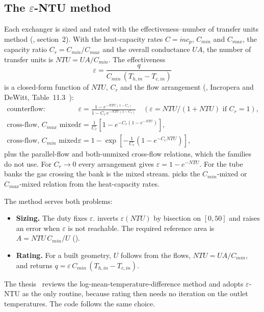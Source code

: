 \documentclass[a4paper,11pt]{article}
\begin{document}
\subsection{The $\varepsilon$-NTU method}\label{sec:entu}
Each exchanger is sized and rated with the effectiveness--number of transfer units method
(, section~2). With the heat-capacity rates $C = \dot m c_p$,
$C_{min}$ and $C_{max}$, the capacity ratio $C_r = C_{min}/C_{max}$ and the overall
conductance $UA$, the number of transfer units is $NTU = UA/C_{min}$. The effectiveness
\begin{equation}
  \varepsilon = \frac{q}{C_{min}\,(T_{h,in} - T_{c,in})}
\end{equation}
is a closed-form function of $NTU$, $C_r$ and the flow arrangement
(, Incropera and DeWitt, Table~11.3~\cite{incropera}):
\begin{align}
  \text{counterflow:}&\quad \varepsilon = \frac{1 - e^{-NTU(1-C_r)}}{1 - C_r\,e^{-NTU(1-C_r)}}
    \quad(\varepsilon = NTU/(1+NTU) \text{ if } C_r = 1),\\
  \text{cross-flow, } C_{max}\text{ mixed:}&\quad \varepsilon = \frac{1}{C_r}\left[1 - e^{-C_r(1 - e^{-NTU})}\right],\\
  \text{cross-flow, } C_{min}\text{ mixed:}&\quad \varepsilon = 1 - \exp\!\left[-\frac{1}{C_r}\left(1 - e^{-C_r NTU}\right)\right],
\end{align}
plus the parallel-flow and both-unmixed cross-flow relations, which the families do not
use. For $C_r \to 0$ every arrangement gives $\varepsilon = 1 - e^{-NTU}$. For the tube
banks the gas crossing the bank is the mixed stream.  picks the
$C_{min}$-mixed or $C_{max}$-mixed relation from the heat-capacity rates.

The method serves both problems:
\begin{itemize}
\item \textbf{Sizing.} The duty fixes $\varepsilon$.  inverts
  $\varepsilon(NTU)$ by bisection on $[0, 50]$ and raises an error when $\varepsilon$ is not
  reachable. The required reference area is $A = NTU\,C_{min}/U$
  ().
\item \textbf{Rating.} For a built geometry, $U$ follows from the flows,
  $NTU = UA/C_{min}$, and  returns
  $q = \varepsilon\,C_{min}\,(T_{h,in} - T_{c,in})$.
\end{itemize}
The thesis~\cite{marconi2026} reviews the log-mean-temperature-difference method and adopts
$\varepsilon$-NTU as the only routine, because rating then needs no iteration on the outlet
temperatures. The code follows the same choice.
\end{document}
